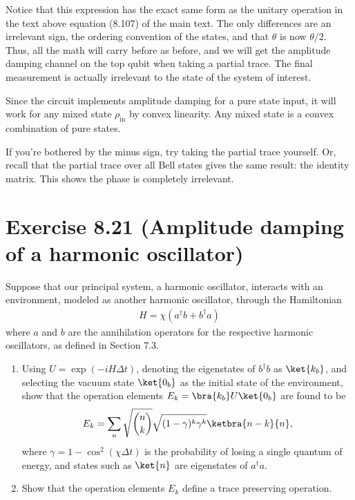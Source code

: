 \documentclass{book}
\begin{document}
    Notice that this expression has the exact same form as the unitary operation in the text above equation (8.107) of the main text. The only differences are an irrelevant sign, the ordering convention of the states, and that $\theta$ is now $\theta/2$. Thus, all the math will carry before as before, and we will get the amplitude damping channel on the top qubit when taking a partial trace. The final measurement is actually irrelevant to the state of the system of interest.

    Since the circuit implements amplitude damping for a pure state input, it will work for any mixed state $\rho_\mathrm{in}$ by convex linearity. Any mixed state is a convex combination of pure states. 

    If you're bothered by the minus sign, try taking the partial trace yourself. Or, recall that the partial trace over all Bell states gives the same result: the identity matrix. This shows the phase is completely irrelevant. 

\section*{Exercise 8.21 (Amplitude damping of a harmonic oscillator)}
    Suppose that our principal system, a harmonic oscillator, interacts with an environment, modeled as another harmonic oscillator, through the Hamiltonian
    \begin{align}
        H = \chi (a^\dagger b + b^\dagger a)
    \end{align}
    where $a$ and $b$ are the annihilation operators for the respective harmonic oscillators, as defined in Section 7.3.

    \begin{enumerate}
        \item Using $U = \exp(-i H \Delta t)$, denoting the eigenstates of $b^\dagger b$ as $\ket{k_b}$, and selecting the vacuum state $\ket{0_b}$ as the initial state of the environment, show that the operation elements $E_k = \bra{k_b}U\ket{0_b}$ are found to be
        \begin{align}
            E_k = \sum_n \sqrt{\binom{n}{k}}\sqrt{(1-\gamma)^k \gamma^k} \ketbra{n-k}{n},
        \end{align}
        where $\gamma = 1- \cos^2(\chi\Delta t)$ is the probability of losing a single quantum of energy, and states such as $\ket{n}$ are eigenstates of $a^\dagger a$.
        \item Show that the operation elements $E_k$ define a trace preserving operation.
    \end{enumerate}
\end{document}
